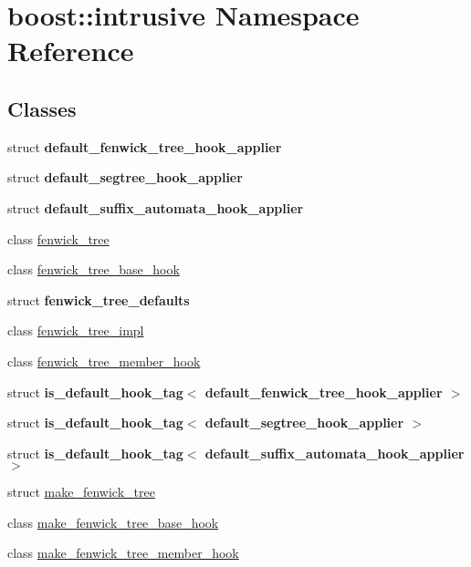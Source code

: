 \hypertarget{namespaceboost_1_1intrusive}{}\section{boost\+:\+:intrusive Namespace Reference}
\label{namespaceboost_1_1intrusive}
\subsection*{Classes}
\begin{DoxyCompactItemize}
\item 
struct {\bfseries default\+\_\+fenwick\+\_\+tree\+\_\+hook\+\_\+applier}
\item 
struct {\bfseries default\+\_\+segtree\+\_\+hook\+\_\+applier}
\item 
struct {\bfseries default\+\_\+suffix\+\_\+automata\+\_\+hook\+\_\+applier}
\item 
class \hyperlink{classboost_1_1intrusive_1_1fenwick__tree}{fenwick\+\_\+tree}
\item 
class \hyperlink{classboost_1_1intrusive_1_1fenwick__tree__base__hook}{fenwick\+\_\+tree\+\_\+base\+\_\+hook}
\item 
struct {\bfseries fenwick\+\_\+tree\+\_\+defaults}
\item 
class \hyperlink{classboost_1_1intrusive_1_1fenwick__tree__impl}{fenwick\+\_\+tree\+\_\+impl}
\item 
class \hyperlink{classboost_1_1intrusive_1_1fenwick__tree__member__hook}{fenwick\+\_\+tree\+\_\+member\+\_\+hook}
\item 
struct {\bfseries is\+\_\+default\+\_\+hook\+\_\+tag$<$ default\+\_\+fenwick\+\_\+tree\+\_\+hook\+\_\+applier $>$}
\item 
struct {\bfseries is\+\_\+default\+\_\+hook\+\_\+tag$<$ default\+\_\+segtree\+\_\+hook\+\_\+applier $>$}
\item 
struct {\bfseries is\+\_\+default\+\_\+hook\+\_\+tag$<$ default\+\_\+suffix\+\_\+automata\+\_\+hook\+\_\+applier $>$}
\item 
struct \hyperlink{structboost_1_1intrusive_1_1make__fenwick__tree}{make\+\_\+fenwick\+\_\+tree}
\item 
class \hyperlink{classboost_1_1intrusive_1_1make__fenwick__tree__base__hook}{make\+\_\+fenwick\+\_\+tree\+\_\+base\+\_\+hook}
\item 
class \hyperlink{classboost_1_1intrusive_1_1make__fenwick__tree__member__hook}{make\+\_\+fenwick\+\_\+tree\+\_\+member\+\_\+hook}
\item 

\end{DoxyCompactItemize}
